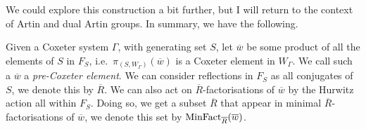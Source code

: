 %
%
%
We could explore this construction a bit further, but I will return to the context of Artin and dual Artin groups.
In summary, we have the following.


Given a Coxeter system $\Gamma$, with generating set $S$, let $\overline{w}$ be some product of  all the elements of $S$ in  $F_S$, i.e.~$\pi_{(S,W_\Gamma)}(\overline{w})$ is a Coxeter element in $W_\Gamma$.
We call such a $\overline{w}$ a \emph{pre-Coxeter element}.
We can consider reflections in $F_S$ as all conjugates of  $S$, we denote this by  $\overline{R}$.
We can also act on $\overline{R}$-factorisations of $\overline{w}$ by the Hurwitz action all within $F_S$.
Doing so, we get a subset $\overline{R}$ that appear in minimal $\overline{R}$-factorisations of $\overline{w}$, we denote this set by $\operatorname{MinFact}_{\overline{R}}(\overline{w})$.

